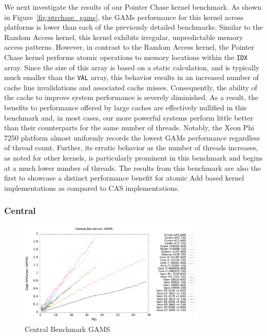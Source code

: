 We next investigate the results of our Pointer Chase kernel benchmark.
As shown in Figure~\ref{fig:ptrchase_gams}, the GAMs performance for this kernel across platforms is lower than each of the previously detailed benchmarks.
Similar to the Random Access kernel, this kernel exhibits irregular, unpredictable memory access patterns.
However, in contrast to the Random Access kernel, the Pointer Chase kernel performs atomic operations to memory locations within the \texttt{IDX} array.
Since the size of this array is based on a static calculation, and is typically much smaller than the \texttt{VAL} array, this behavior results in an increased number of cache line invalidations and associated cache misses. 
Consequently, the ability of the cache to improve system performance is severely diminished.
As a result, the benefits to performance offered by large caches are effectively nullified in this benchmark and, in most cases, our more powerful systems perform little better than their counterparts for the same number of threads.
Notably, the Xeon Phi 7250 platform almost uniformly records the lowest GAMs performance regardless of thread count.
Further, its erratic behavior as the number of threads increases, as noted for other kernels, is particularly prominent in this benchmark and begins at a much lower number of threads.
The results from this benchmark are also the first to showcase a distinct performance benefit for atomic Add based kernel implementations as compared to CAS implementations.

\subsubsection{Central}
\label{subsubsec:central_res}

\begin{figure}[!t]
\centering
\includegraphics[width=3.5in]{figures/CENTRAL_GAMS.png}
\caption{Central Benchmark GAMS}
\label{fig:central_gams}
\end{figure}

